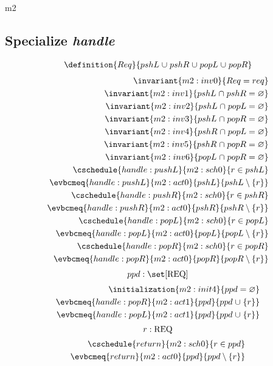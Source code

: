 \documentclass[12pt]{amsart}
\newcommand{\REQ}{\text{REQ}}
\begin{document}
\begin{machine}{m2}
  \subsection{Specialize \emph{handle}}
  \begin{align*}
    \definition{Req}{ pshL \bunion 
        pshR \bunion 
        popL \bunion 
        popR } 
  \end{align*}
  \begin{align}
    \invariant{m2:inv0}{ Req = req } \\
    \invariant{m2:inv1}{ pshL \binter pshR = \emptyset } \\
    \invariant{m2:inv2}{ pshL \binter popL = \emptyset } \\
    \invariant{m2:inv3}{ pshL \binter popR = \emptyset } \\
    \invariant{m2:inv4}{ pshR \binter popL = \emptyset } \\
    \invariant{m2:inv5}{ pshR \binter popR = \emptyset } \\
    \invariant{m2:inv6}{ popL \binter popR = \emptyset } \\
    \cschedule{handle:pushL}{m2:sch0}{ r \in pshL } \\
    \evbcmeq{handle:pushL}{m2:act0}{pshL}{pshL \setminus \{ r \}} \\
    \cschedule{handle:pushR}{m2:sch0}{ r \in pshR } \\
    \evbcmeq{handle:pushR}{m2:act0}{pshR}{pshR \setminus \{ r \}} \\
    \cschedule{handle:popL}{m2:sch0}{ r \in popL } \\
    \evbcmeq{handle:popL}{m2:act0}{popL}{popL \setminus \{ r \}} \\
    \cschedule{handle:popR}{m2:sch0}{ r \in popR } \\
    \evbcmeq{handle:popR}{m2:act0}{popR}{popR \setminus \{ r \}} 
  \end{align}
  \[ \variable{ ppd : \set [\REQ] } \]
  \begin{align}
    \initialization{m2:init4}{ ppd = \emptyset } \\
    \evbcmeq{handle:popR}{m2:act1}{ppd}{ ppd \bunion \{r\} } \\
    \evbcmeq{handle:popL}{m2:act1}{ppd}{ ppd \bunion \{r\} }
  \end{align}
  \[ \indices{return}{ r : \REQ } \]
  \begin{align}
    \cschedule{return}{m2:sch0}{ r \in ppd } \\
    \evbcmeq{return}{m2:act0}{ppd}{ ppd \setminus \{ r \} }
  \end{align}

\end{machine}
\end{document}
